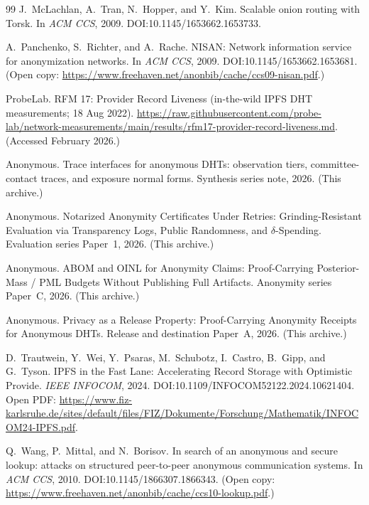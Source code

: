 \documentclass[11pt]{article}
\begin{document}
\begin{thebibliography}{99}
J.~McLachlan, A.~Tran, N.~Hopper, and Y.~Kim.
\newblock Scalable onion routing with Torsk.
\newblock In \emph{ACM CCS}, 2009.
\newblock DOI:10.1145/1653662.1653733.

A.~Panchenko, S.~Richter, and A.~Rache.
\newblock NISAN: Network information service for anonymization networks.
\newblock In \emph{ACM CCS}, 2009.
\newblock DOI:10.1145/1653662.1653681. (Open copy: \url{https://www.freehaven.net/anonbib/cache/ccs09-nisan.pdf}.)

ProbeLab.
\newblock RFM 17: Provider Record Liveness (in-the-wild IPFS DHT measurements; 18 Aug 2022).
\newblock \url{https://raw.githubusercontent.com/probe-lab/network-measurements/main/results/rfm17-provider-record-liveness.md}. (Accessed February 2026.)

Anonymous.
\newblock Trace interfaces for anonymous DHTs: observation tiers, committee-contact traces, and exposure normal forms.
\newblock Synthesis series note, 2026. (This archive.)

Anonymous.
\newblock Notarized Anonymity Certificates Under Retries: Grinding-Resistant Evaluation via Transparency Logs, Public Randomness, and $\delta$-Spending.
\newblock Evaluation series Paper~1, 2026. (This archive.)

Anonymous.
\newblock ABOM and OINL for Anonymity Claims: Proof-Carrying Posterior-Mass / PML Budgets Without Publishing Full Artifacts.
\newblock Anonymity series Paper~C, 2026. (This archive.)

Anonymous.
\newblock Privacy as a Release Property: Proof-Carrying Anonymity Receipts for Anonymous DHTs.
\newblock Release and destination Paper~A, 2026. (This archive.)

D.~Trautwein, Y.~Wei, Y.~Psaras, M.~Schubotz, I.~Castro, B.~Gipp, and G.~Tyson.
\newblock IPFS in the Fast Lane: Accelerating Record Storage with Optimistic Provide.
\newblock \emph{IEEE INFOCOM}, 2024.
\newblock DOI:10.1109/INFOCOM52122.2024.10621404.
\newblock Open PDF: \url{https://www.fiz-karlsruhe.de/sites/default/files/FIZ/Dokumente/Forschung/Mathematik/INFOCOM24-IPFS.pdf}.

Q.~Wang, P.~Mittal, and N.~Borisov.
\newblock In search of an anonymous and secure lookup: attacks on structured peer-to-peer anonymous communication systems.
\newblock In \emph{ACM CCS}, 2010.
\newblock DOI:10.1145/1866307.1866343. (Open copy: \url{https://www.freehaven.net/anonbib/cache/ccs10-lookup.pdf}.)


\end{thebibliography}
\end{document}
